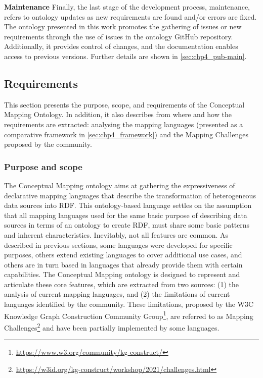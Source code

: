 \noindent\textbf{Maintenance}
Finally, the last stage of the development process, maintenance, refers to ontology updates as new requirements are found and/or errors are fixed. The ontology presented in this work promotes the gathering of issues or new requirements through the use of issues in the ontology GitHub repository. Additionally, it provides control of changes, and the documentation enables access to previous versions. Further details are shown in \cref{sec:chp4_pub-main}.



\subsection{Requirements}
\label{sec:chp4_requirements}
This section presents the purpose, scope, and requirements of the Conceptual Mapping Ontology. In addition, it also describes from where and how the requirements are extracted: analysing the mapping languages (presented as a comparative framework in \cref{sec:chp4_framework}) and the Mapping Challenges proposed by the community.

\subsubsection{Purpose and scope}

The Conceptual Mapping ontology aims at gathering the expressiveness of declarative mapping languages that describe the transformation of heterogeneous data sources into RDF. This ontology-based language settles on the assumption that all mapping languages used for the same basic purpose of describing data sources in terms of an ontology to create RDF, must share some basic patterns and inherent characteristics. Inevitably, not all features are common. As described in previous sections, some languages were developed for specific purposes, others extend existing languages to cover additional use cases, and others are in turn based in languages that already provide them with certain capabilities. The Conceptual Mapping ontology is designed to represent and articulate these core features, which are extracted from two sources: (1) the analysis of current mapping languages, and (2) the limitations of current languages identified by the community. These limitations, proposed by the W3C Knowledge Graph Construction Community Group\footnote{\label{foot:kgc}\url{https://www.w3.org/community/kg-construct/}}, are referred to as Mapping Challenges\footnote{\label{foot:challenges}\url{https://w3id.org/kg-construct/workshop/2021/challenges.html}} and have been partially implemented by some languages. %

